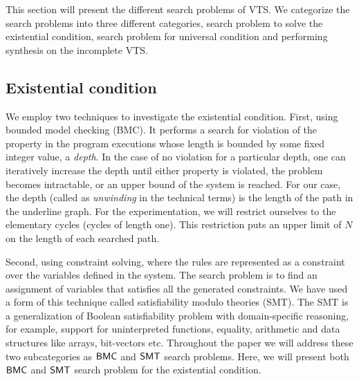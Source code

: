 This section will present the different search problems of VTS.
%
We categorize the search problems into three different categories, search problem to solve the existential condition, search problem for universal condition and performing synthesis on the incomplete VTS. 

\subsection{Existential condition}
We employ two techniques to investigate the existential condition. 
%
First, using bounded model checking (BMC).
%
It performs a search for violation of the property in the program executions whose length is bounded by some fixed integer value, a \textit{depth}. 
%
In the case of no violation for a particular depth, one can iteratively increase the depth until either property is violated, the problem becomes intractable, or an upper bound of the system is reached.
%
For our case, the depth (called as \textit{unwinding} in the technical terms) is the length of the path in the underline graph.
%
%
For the experimentation, we will restrict ourselves to the elementary cycles (cycles of length one). 
%
This restriction puts an upper limit of $N$ on the length of each searched path. 
%
%

Second, using constraint solving, where the rules are represented as a constraint over the variables defined in the system.
%
The search problem is to find an assignment of variables that satisfies all the generated constraints.
%
We have used a form of this technique called satisfiability modulo theories (SMT).
%
The SMT is a generalization of Boolean satisfiability problem with domain-specific reasoning, for example, support for uninterpreted functions, equality, arithmetic and data structures like arrays, bit-vectors etc. 
%
%
Throughout the paper we will address these two subcategories as $\mathsf{BMC}$ and $\mathsf{SMT}$ search problems.
%
%
Here, we will present both $\mathsf{BMC}$ and $\mathsf{SMT}$ search problem for the existential condition.

